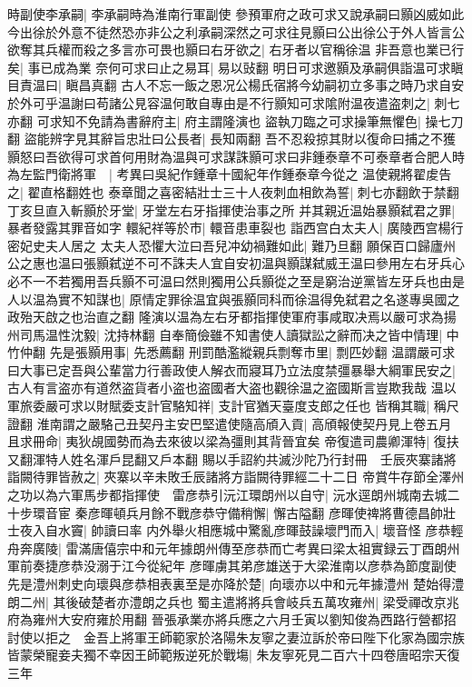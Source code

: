 時副使李承嗣|{
	李承嗣時為淮南行軍副使}
參預軍府之政可求又說承嗣曰顥凶威如此今出徐於外意不徒然恐亦非公之利承嗣深然之可求往見顥曰公出徐公于外人皆言公欲奪其兵權而殺之多言亦可畏也顥曰右牙欲之|{
	右牙者以官稱徐温}
非吾意也業已行矣|{
	事已成為業}
奈何可求曰止之易耳|{
	易以䜴翻}
明日可求邀顥及承嗣俱詣温可求瞋目責温曰|{
	瞋昌真翻}
古人不忘一飯之恩况公楊氏宿將今幼嗣初立多事之時乃求自安於外可乎温謝曰苟諸公見容温何敢自專由是不行顥知可求隂附温夜遣盗刺之|{
	刺七亦翻}
可求知不免請為書辭府主|{
	府主謂隆演也}
盜執刀臨之可求操筆無懼色|{
	操七刀翻}
盜能辨字見其辭旨忠壯曰公長者|{
	長知兩翻}
吾不忍殺掠其財以復命曰捕之不獲顥怒曰吾欲得可求首何用財為温與可求謀誅顥可求曰非鍾泰章不可泰章者合肥人時為左監門衛將軍　|{
	考異曰吳紀作鍾章十國紀年作鍾泰章今從之}
温使親將翟䖍告之|{
	翟直格翻姓也}
泰章聞之喜密結壯士三十人夜刺血相飲為誓|{
	刺七亦翻飲于禁翻}
丁亥旦直入斬顥於牙堂|{
	牙堂左右牙指揮使治事之所}
并其親近温始暴顥弑君之罪|{
	暴者發露其罪音如字}
轘紀祥等於市|{
	轘音患車裂也}
詣西宫白太夫人|{
	廣陵西宫楊行密妃史夫人居之}
太夫人恐懼大泣曰吾兒冲幼禍難如此|{
	難乃旦翻}
願保百口歸廬州公之惠也温曰張顥弑逆不可不誅夫人宜自安初温與顥謀弑威王温曰參用左右牙兵心必不一不若獨用吾兵顥不可温曰然則獨用公兵顥從之至是窮治逆黨皆左牙兵也由是人以温為實不知謀也|{
	原情定罪徐温宜與張顥同科而徐温得免弑君之名遂專吳國之政殆天啟之也治直之翻}
隆演以温為左右牙都指揮使軍府事咸取决焉以嚴可求為揚州司馬温性沈毅|{
	沈持林翻}
自奉簡儉雖不知書使人讀獄訟之辭而决之皆中情理|{
	中竹仲翻}
先是張顥用事|{
	先悉薦翻}
刑罰酷濫縱親兵剽奪市里|{
	剽匹妙翻}
温謂嚴可求曰大事已定吾與公輩當力行善政使人解衣而寢耳乃立法度禁彊暴舉大綱軍民安之|{
	古人有言盗亦有道然盗貨者小盗也盗國者大盗也觀徐温之盗國斯言豈欺我哉}
温以軍旅委嚴可求以財賦委支計官駱知祥|{
	支計官猶天臺度支郎之任也}
皆稱其職|{
	稱尺證翻}
淮南謂之嚴駱己丑契丹主安巴堅遣使隨高頎入貢|{
	高頎報使契丹見上卷五月}
且求冊命|{
	夷狄覘國勢而為去來彼以梁為彊則其背晉宜矣}
帝復遣司農卿渾特|{
	復扶又翻渾特人姓名渾戶昆翻又戶本翻}
賜以手詔約共滅沙陀乃行封冊　壬辰夾寨諸將詣闕待罪皆赦之|{
	夾寨以辛未敗壬辰諸將方詣闕待罪經二十二日}
帝賞牛存節全澤州之功以為六軍馬步都指揮使　雷彦恭引沅江環朗州以自守|{
	沅水逕朗州城南去城二十步環音宦}
秦彦暉頓兵月餘不戰彦恭守備稍懈|{
	懈古隘翻}
彦暉使禆將曹德昌帥壯士夜入自水竇|{
	帥讀曰率}
内外舉火相應城中驚亂彦暉鼓譟壞門而入|{
	壞音怪}
彦恭輕舟奔廣陵|{
	雷滿唐僖宗中和元年據朗州傳至彦恭而亡考異曰梁太祖實録云丁酉朗州軍前奏捷彦恭没溺于江今從紀年}
彦暉虜其弟彦雄送于大梁淮南以彦恭為節度副使先是澧州刺史向瓌與彦恭相表裏至是亦降於楚|{
	向瓌亦以中和元年據澧州}
楚始得澧朗二州|{
	其後破楚者亦澧朗之兵也}
蜀主遣將將兵會岐兵五萬攻雍州|{
	梁受禪改京兆府為雍州大安府雍於用翻}
晉張承業亦將兵應之六月壬寅以劉知俊為西路行營都招討使以拒之　金吾上將軍王師範家於洛陽朱友寧之妻泣訴於帝曰陛下化家為國宗族皆蒙榮寵妾夫獨不幸因王師範叛逆死於戰塲|{
	朱友寧死見二百六十四卷唐昭宗天復三年}
